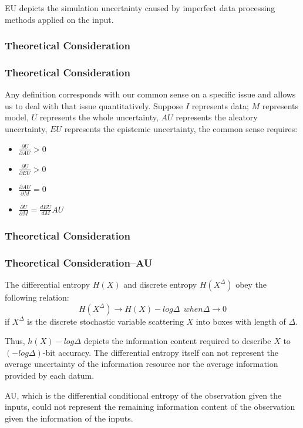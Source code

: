 \documentclass{beamer}
\begin{document}
\begin{CJK}{UTF8}{gkai}
\begin{frame}
EU depicts the simulation uncertainty caused by imperfect data processing methods applied on the input.
\end{frame}

\begin{frame}
\frametitle{Theoretical Consideration}

\end{frame}

\begin{frame}
\frametitle{Theoretical Consideration}
Any definition corresponds with our common sense on a specific issue and allows us to deal with that issue quantitatively.  Suppose $I$ represents data; $M$ represents model, $U$ represents the whole uncertainty, $AU$ represents the aleatory uncertainty, $EU$ represents the epistemic uncertainty, the common sense requires: 
\begin{itemize}
\item $\frac{\partial U}{\partial AU}>0$ 
\item $\frac{\partial U}{\partial EU}>0$
\item $\frac{\partial AU}{\partial M}=0$
\item $\frac{\partial U}{\partial M}=\frac{d EU}{d M}AU$
\end{itemize} 
\end{frame}

\begin{frame}
\frametitle{Theoretical Consideration}

\end{frame}

\begin{frame}
\frametitle{Theoretical Consideration--AU}
The differential entropy $H(X)$ and discrete entropy $H(X^\Delta)$ obey the following relation:
\begin{equation*}
H(X^\Delta)\to H(X)-log\Delta~~when \Delta \to 0
\end{equation*}
if $X^\Delta$ is the discrete stochastic variable scattering $X$ into boxes with length of $\Delta$.
 
Thus, $h(X)-log\Delta $ depicts the information content required to describe $X$ to $(-log\Delta)$-bit accuracy. The differential entropy itself can not represent the average uncertainty of the information resource nor the average information provided by each datum.

AU, which is the differential conditional entropy of the observation given the inputs, could not represent the remaining information content of the observation given the information of the inputs.
\end{frame}


\end{CJK}
\end{document}

